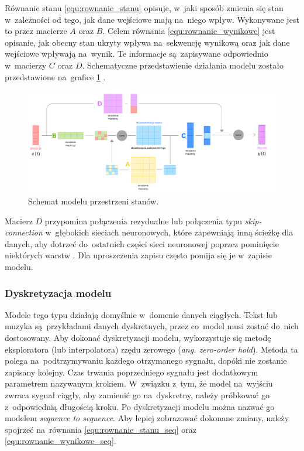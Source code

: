\documentclass[data-science]{agh-wi} %
\begin{document}
Równanie stanu \ref*{equ:rownanie_stanu} opisuje, w~jaki sposób zmienia się stan w~zależności od tego, jak dane wejściowe mają na~niego wpływ. Wykonywane jest to przez macierze $A$ oraz $B$. Celem równania \ref*{equ:rownanie_wynikowe} jest opisanie, jak obecny stan ukryty wpływa na~sekwencję wynikową oraz jak dane wejściowe wpływają na~wynik. Te informacje są~zapisywane odpowiednio w~macierzy $C$ oraz $D$. Schematyczne przedstawienie działania modelu zostało przedstawione na~grafice \ref*{fig:ssm_scheme} \cite*{mamba_guide}.

\begin{figure}[ht!]
    \begin{center}
        \includegraphics[width=0.9\linewidth]{./img/new_ssm_scheme.pdf}
    \end{center}
    \caption{Schemat modelu przestrzeni stanów.}\label{fig:ssm_scheme}
\end{figure}

Macierz $D$ przypomina połączenia rezydualne lub połączenia typu \textit{skip-connection} w~głębokich sieciach neuronowych, które zapewniają inną ścieżkę dla danych, aby dotrzeć do~ostatnich części sieci neuronowej poprzez pominięcie niektórych warstw \cite{resnet}. Dla uproszczenia zapisu często pomija się je w~zapisie modelu.

\subsubsection*{Dyskretyzacja modelu}
Modele tego typu działają domyślnie w~domenie danych ciągłych. Tekst lub muzyka są~przykładami danych dyskretnych, przez co~model musi zostać do~nich dostosowany. Aby dokonać dyskretyzacji modelu, wykorzystuje się metodę eksploratora (lub interpolatora) rzędu zerowego (\textit{ang. zero-order hold}). Metoda ta polega na~podtrzymywaniu każdego otrzymanego sygnału, dopóki nie zostanie zapisany kolejny. Czas trwania poprzedniego sygnału jest dodatkowym parametrem nazywanym krokiem. W~związku z~tym, że model na~wyjściu zwraca sygnał ciągły, aby zamienić go na~dyskretny, należy próbkować go z~odpowiednią długością kroku. Po dyskretyzacji modelu można nazwać go modelem \textit{sequence to sequence}. Aby lepiej zobrazować dokonane zmiany, należy spojrzeć na~równania \ref*{equ:rownanie_stanu_seq} oraz \ref*{equ:rownanie_wynikowe_seq}.
\end{document}
